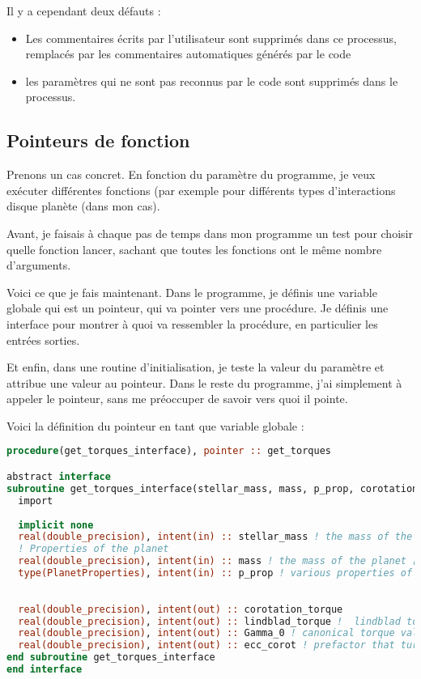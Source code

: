 Il y a cependant deux défauts : 
\begin{itemize}
\item Les commentaires écrits par l'utilisateur sont supprimés dans ce processus, remplacés par les commentaires automatiques générés par le code
\item les paramètres qui ne sont pas reconnus par le code sont supprimés dans le processus. 
\end{itemize}

\subsection{Pointeurs de fonction}
Prenons un cas concret. En fonction du paramètre du programme, je veux exécuter différentes fonctions (par exemple pour différents types d'interactions disque planète (dans mon cas). 

Avant, je faisais à chaque pas de temps dans mon programme un test pour choisir quelle fonction lancer, sachant que toutes les fonctions ont le même nombre d'arguments. 

\bigskip

Voici ce que je fais maintenant. Dans le programme, je définis une variable globale qui est un pointeur, qui va pointer vers une procédure. Je définis une interface pour montrer à quoi va ressembler la procédure, en particulier les entrées sorties. 

Et enfin, dans une routine d'initialisation, je teste la valeur du paramètre et attribue une valeur au pointeur. Dans le reste du programme, j'ai simplement à appeler le pointeur, sans me préoccuper de savoir vers quoi il pointe.

Voici la définition du pointeur en tant que variable globale : 
\begin{lstlisting}[language=Fortran]
procedure(get_torques_interface), pointer :: get_torques

abstract interface 
subroutine get_torques_interface(stellar_mass, mass, p_prop, corotation_torque, lindblad_torque, Gamma_0, ecc_corot)
  import 
  
  implicit none
  real(double_precision), intent(in) :: stellar_mass ! the mass of the central body [Msun * K2]
  ! Properties of the planet
  real(double_precision), intent(in) :: mass ! the mass of the planet [Msun * K2]
  type(PlanetProperties), intent(in) :: p_prop ! various properties of the planet
  
  
  real(double_precision), intent(out) :: corotation_torque
  real(double_precision), intent(out) :: lindblad_torque !  lindblad torque exerted by the disk on the planet [\Gamma_0]
  real(double_precision), intent(out) :: Gamma_0 ! canonical torque value [Ms.AU^2](equation (8) of Paardekooper, Baruteau, 2009)
  real(double_precision), intent(out) :: ecc_corot ! prefactor that turns out the corotation torque if the eccentricity is too high (Bitsch & Kley, 2010)
end subroutine get_torques_interface
end interface
\end{lstlisting}

